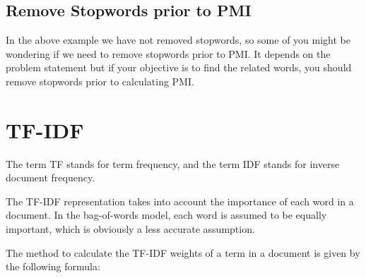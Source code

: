 \subsection{Remove Stopwords prior to PMI}
In the above example we have not removed stopwords, so some of you might be wondering if we need to remove stopwords prior to PMI. It depends on the problem statement but if your objective is to find the related words, you should remove stopwords prior to calculating PMI. 

\section{TF-IDF}
\label{sec:nlp_tf_idf}

The term TF stands for term frequency, and the term IDF stands for inverse document frequency.

The TF-IDF representation takes into account the importance of each word in a document. In the bag-of-words model, each word is assumed to be equally important, which is obviously a less accurate assumption.

The method to calculate the TF-IDF weights of a term in a document is given by the following formula:

